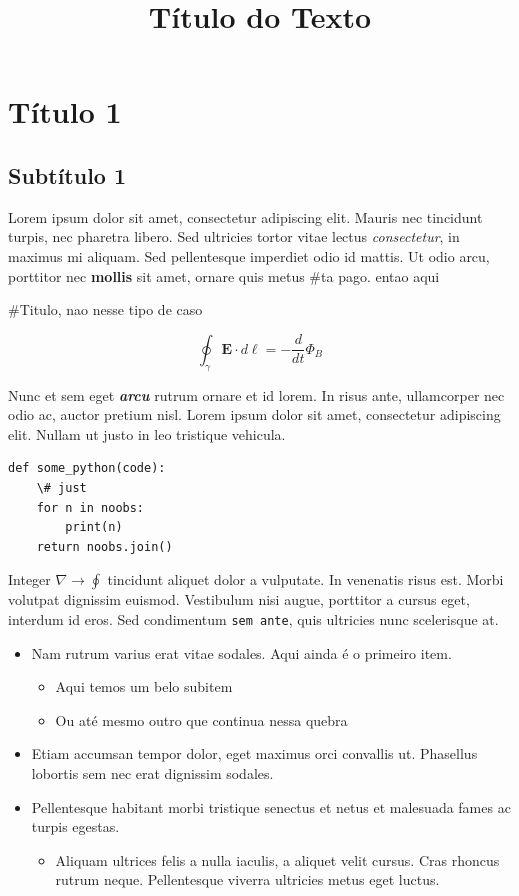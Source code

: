 \documentclass[10pt]{book}
\title{Título do Texto}
\author{}
\date{}
\begin{document}
\chapter{Título 1}

\section{Subtítulo 1}

Lorem ipsum dolor sit amet, consectetur adipiscing elit. Mauris nec tincidunt turpis, nec pharetra libero. Sed ultricies tortor vitae lectus \textit{consectetur}, in maximus mi aliquam. Sed pellentesque imperdiet odio id mattis. Ut odio arcu, porttitor nec \textbf{mollis} sit amet, ornare quis metus \#ta pago. entao aqui

\#Titulo, nao nesse tipo de caso

\begin{equation*}
\oint_\gamma \mathbf{E}\cdot d\boldsymbol{\ell} = -\frac{d}{dt}\Phi_B
\end{equation*}

Nunc et sem eget \textbf{\textit{arcu}} rutrum ornare et id lorem. In risus ante, ullamcorper nec odio ac, auctor pretium nisl. Lorem ipsum dolor sit amet, consectetur adipiscing elit. Nullam ut justo in leo tristique vehicula. 

\begin{verbatim}
def some_python(code):
    \# just
    for n in noobs:
        print(n)
    return noobs.join()
\end{verbatim}

Integer $\nabla \to \oint$ tincidunt aliquet dolor a vulputate. In venenatis risus est. Morbi volutpat dignissim euismod. Vestibulum nisi augue, porttitor a cursus eget, interdum id eros. Sed condimentum \texttt{sem ante}, quis ultricies nunc scelerisque at. 

\begin{itemize}
\item Nam rutrum varius erat vitae sodales.
Aqui ainda é o primeiro item.
	\begin{itemize}
	\item Aqui temos um belo subitem
	\item Ou até mesmo outro
	que continua nessa quebra
	\end{itemize}
\item Etiam accumsan tempor dolor, eget maximus orci convallis ut. Phasellus lobortis sem nec erat dignissim sodales. 
\item Pellentesque habitant morbi tristique senectus et netus et malesuada fames ac turpis egestas. 
	\begin{itemize}
	\item Aliquam ultrices felis a nulla iaculis, a aliquet velit cursus. Cras rhoncus rutrum neque. Pellentesque viverra ultricies metus eget luctus.
	\end{itemize}
\end{itemize}
\end{document}
